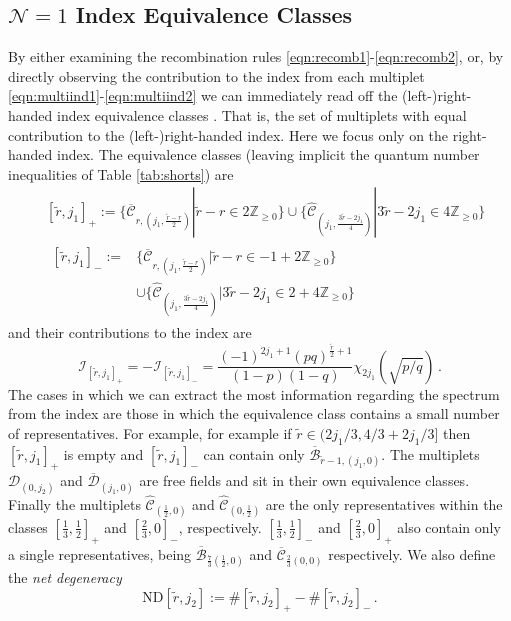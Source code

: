 \documentclass[main.tex]{subfiles}
\begin{document}
\subsection{\texorpdfstring{$\mathcal{N}=1$}{N=1} Index Equivalence Classes}
By either examining the recombination rules \eqref{eqn:recomb1}-\eqref{eqn:recomb2}, or, by directly observing the contribution to the index from each multiplet \eqref{eqn:multiind1}-\eqref{eqn:multiind2} we can immediately read off the (left-)right-handed index equivalence classes \cite{Gadde:2009dj,Beem:2012yn,Evtikhiev:2017heo}. That is, the set of multiplets with equal contribution to the (left-)right-handed index. Here we focus only on the right-handed index. The equivalence classes (leaving implicit the quantum number inequalities of Table \ref{tab:shorts}) are
\begin{align}
&[\widetilde{r},j_1]_+:=\{\overline{\mathcal{C}}_{r,(j_1,\frac{\widetilde{r}-r}{2})}|\widetilde{r}-r\in2\mathbb{Z}_{\geq0}\}\cup\{\hat{\mathcal{C}}_{(j_1,\frac{3\widetilde{r}-2j_1}{4})}|3\widetilde{r}-2j_1\in4\mathbb{Z}_{\geq0}\}\\
&\begin{aligned}
[\widetilde{r},j_1]_-:=&\{\overline{\mathcal{C}}_{r,(j_1,\frac{\widetilde{r}-r}{2})}|\widetilde{r}-r\in-1+2\mathbb{Z}_{\geq0}\}\\
&\cup\{\hat{\mathcal{C}}_{(j_1,\frac{3\widetilde{r}-2j_1}{4})}|3\widetilde{r}-2j_1\in2+4\mathbb{Z}_{\geq0}\}
\end{aligned}
\end{align}
and their contributions to the index are
\begin{equation}\label{eqn:indequiv}
\mathcal{I}_{[\widetilde{r},j_1]_+}=-\mathcal{I}_{[\widetilde{r},j_1]_-}=\frac{(-1)^{2j_1+1}(pq)^{\frac{\widetilde{r}}{2}+1}}{(1-p)(1-q)}\chi_{2j_1}(\sqrt{p/q})\,.
\end{equation} 
The cases in which we can extract the most information regarding the spectrum from the index are those in which the equivalence class contains a small number of representatives. For example, for example if $\widetilde{r}\in(2j_1/3,4/3+2j_1/3]$ then $[\widetilde{r},j_1]_+$ is empty and $[\widetilde{r},j_1]_-$ can contain only $\overline{\mathcal{B}}_{\widetilde{r}-1,(j_1,0)}$. The multiplets $\mathcal{D}_{(0,j_2)}$ and $\overline{\mathcal{D}}_{(j_1,0)}$ are free fields and sit in their own equivalence classes. Finally the multiplets $\hat{\mathcal{C}}_{(\frac{1}{2},0)}$ and $\hat{\mathcal{C}}_{(0,\frac{1}{2})}$ are the only representatives within the classes $[\frac{1}{3},\frac{1}{2}]_+$ and $[\frac{2}{3},0]_-$, respectively. $[\frac{1}{3},\frac{1}{2}]_-$ and $[\frac{2}{3},0]_+$ also contain only a single representatives, being $\overline{\mathcal{B}}_{\frac{7}{3}(\frac{1}{2},0)}$ and $\overline{\mathcal{C}}_{\frac{2}{3}(0,0)}$ respectively. 
We also define the \textit{net degeneracy}
\begin{equation}\label{eqn:netdegen}
\text{ND}[\widetilde{r},j_2]:=\#[\widetilde{r},j_2]_+-\#[\widetilde{r},j_2]_-\,.
\end{equation}
\end{document}
